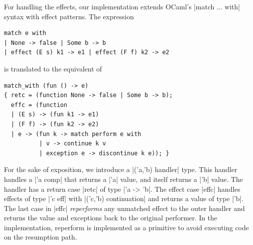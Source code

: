 \documentclass[sigplan,screen]{acmart}
\begin{document}
For handling the effects, our implementation extends OCaml's |match ... with|
syntax with effect patterns. The expression
\begin{lstlisting}
match e with
| None -> false | Some b -> b
| effect (E s) k1 -> e1 | effect (F f) k2 -> e2
\end{lstlisting}
\noindent is translated to the equivalent of
\begin{lstlisting}
match_with (fun () -> e)
{ retc = (function None -> false | Some b -> b);
  effc = (function
  | (E s) -> (fun k1 -> e1)
  | (F f) -> (fun k2 -> e2)
  | e -> (fun k -> match perform e with
          | v -> continue k v
          | exception e -> discontinue k e)); }
\end{lstlisting}
For the sake of exposition, we introduce a |('a,'b) handler| type. This handler
handles a |'a comp| that returns a |'a| value, and itself returns a |'b| value.
The handler has a return case |retc| of type |'a -> 'b|. The effect case |effc|
handles effects of type |'c eff| with |('c,'b) continuation| and returns a
value of type |'b|. The last case in |effc| \emph{reperforms} any unmatched
effect to the outer handler and returns the value and exceptions back to the
original performer. In the implementation, reperform is implemented as a
primitive to avoid executing code on the resumption path.
\end{document}
